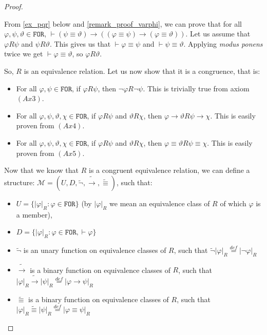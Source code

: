 \documentclass{article}
\theoremstyle{definition}
\theoremstyle{definition}
\theoremstyle{definition}
\newcommand*{\id}{\equiv}
\newcommand*{\ra}{\rightarrow}
\newcommand*{\FOR}{\texttt{FOR}}
\begin{document}
\begin{proof}
\begin{itemize}[]
              From \cref{ex_pqr} below and \cref{remark_proof_varphi}, we can prove that for
              all $\varphi, \psi, \vartheta \in \FOR$, $\vdash (\psi \id \vartheta) \ra
                  ((\varphi \id \psi) \ra (\varphi \id \vartheta))$. Let us assume that $\varphi
                  R \psi$ and $\psi R \vartheta$. This gives us that $\vdash \varphi \id \psi$
              and $\vdash \psi \id \vartheta$. Applying \emph{modus ponens} twice we get
              $\vdash \varphi \id \vartheta$, so $\varphi R \vartheta$.
    \end{itemize}
    So, $R$ is an equivalence relation. Let us now show that it is a congruence,
    that is:
    \begin{itemize}[]
        \item For all $\varphi, \psi \in \FOR$, if $\varphi R \psi$, then $\lnot \varphi R
                  \lnot \psi$. This is trivially true from axiom $(Ax3)$.
        \item For all $\varphi, \psi, \vartheta, \chi \in \FOR$, if $\varphi R \psi$ and
              $\vartheta R \chi$, then $\varphi \ra \vartheta R \psi \ra \chi$. This is
              easily proven from $(Ax4)$.
        \item For all $\varphi, \psi, \vartheta, \chi \in \FOR$, if $\varphi R \psi$ and
              $\vartheta R \chi$, then $\varphi \id \vartheta R \psi \id \chi$. This is
              easily proven from $(Ax5)$.
    \end{itemize}
    Now that we know that $R$ is a congruent equivalence relation, we can define a
    structure: $\mathcal{M} = (U, D, \tilde{\lnot}, \tilde{\ra}, \tilde{\id})$,
    such that:
    \begin{itemize}
        \item $U = \{ |\varphi|_R : \varphi \in \FOR \}$ (by $|\varphi|_R$ we mean an equivalence class of $R$ of which $\varphi$ is a member),
        \item $D = \{ |\varphi|_R : \varphi \in \FOR, \vdash \varphi\}$
        \item $\tilde{\lnot}$ is an unary function on equivalence classes of $R$, such that $\tilde{\lnot}|\varphi|_R \stackrel{def}{=} |\lnot \varphi|_R$
        \item $\tilde{\ra}$ is a binary function on equivalence classes of $R$, such that $|\varphi|_R \tilde{\ra} |\psi|_R \stackrel{def}{=} |\varphi \ra \psi|_R$
        \item $\tilde{\id}$ is a binary function on equivalence classes of $R$, such that $|\varphi|_R \tilde{\id} |\psi|_R \stackrel{def}{=} |\varphi \id \psi|_R$

\end{itemize}
\end{proof}
\end{document}
